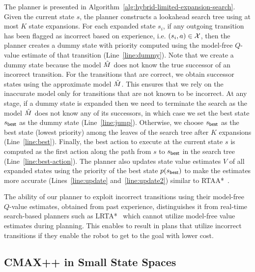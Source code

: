 The planner is presented in
Algorithm~\ref{alg:hybrid-limited-expansion-search}. Given the current
state $s$, the planner constructs a lookahead search tree using at
most $K$ state expansions. For each expanded state $s_i$, if any
outgoing transition has been flagged as incorrect based on experience, i.e. $(s_i, a) \in \mathcal{X}$,
then the planner creates a dummy state with priority computed using
the model-free $Q$-value estimate of that transition
(Line~\ref{line:dummy}). Note that we create a dummy state because the
model $\hat{M}$ does not know the true successor of an incorrect transition.
For
the transitions that are correct, we obtain successor states
using the approximate model $\hat{M}$. This ensures that we rely on the
inaccurate model only for transitions that are not known to be
incorrect.
At any stage, if a dummy state is expanded then we need to terminate
the search as the model $\hat{M}$ does not know any of its successors,
in which case we set the best state $s_{\mathsf{best}}$ as the dummy state (Line~\ref{line:jump}).
Otherwise, we choose $s_{\mathsf{best}}$ as the best state (lowest priority)
among the
leaves of the search tree after $K$ expansions (Line~\ref{line:best}). Finally, the best
action to execute at the current state $s$ is computed as the first
action along the path from $s$ to $s_{\mathsf{best}}$ in the search tree (Line~\ref{line:best-action}). The
planner also updates state value estimates $V$ of all expanded states
using the priority of the best state $p(s_{\mathsf{best}})$ to make the
estimates more accurate (Lines~\ref{line:update}
and~\ref{line:update2}) similar to RTAA*~\cite{DBLP:conf/atal/KoenigL06}.


The ability of our planner to exploit incorrect transitions using
their model-free $Q$-value estimates, obtained from past experience,
distinguishes it from
real-time search-based planners such as
LRTA*~\cite{DBLP:journals/ai/Korf90} which cannot utilize model-free
value estimates during planning.
This enables \cmaxpp{} to
result in plans that utilize incorrect transitions if they enable the
robot to get to the goal with lower cost.

\subsection{CMAX++ in  Small State Spaces}
\label{sec:warm-up:-small}

